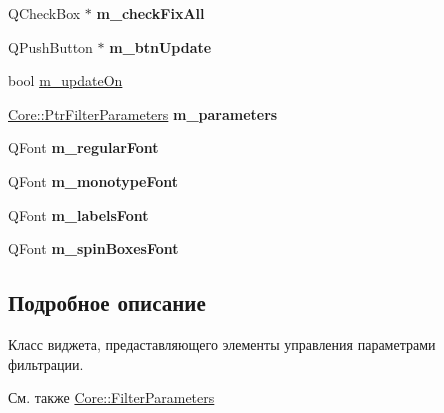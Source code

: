 \begin{DoxyCompactItemize}
\item 
\hypertarget{class_filter_parameters_widget_a0309087dfdcd0b9266fda00298aa8497}{}\label{class_filter_parameters_widget_a0309087dfdcd0b9266fda00298aa8497} 
Q\+Check\+Box $\ast$ {\bfseries m\+\_\+check\+Fix\+All}
\item 
\hypertarget{class_filter_parameters_widget_a1df61481716842b7b816a147590573f7}{}\label{class_filter_parameters_widget_a1df61481716842b7b816a147590573f7} 
Q\+Push\+Button $\ast$ {\bfseries m\+\_\+btn\+Update}
\item 
bool \hyperlink{class_filter_parameters_widget_a972435cbd7b57d2c3de2f933e7616c1c}{m\+\_\+update\+On}
\item 
\hypertarget{class_filter_parameters_widget_a55cf14ba922106b95c07267afb79d92a}{}\label{class_filter_parameters_widget_a55cf14ba922106b95c07267afb79d92a} 
\hyperlink{namespace_core_a4811af8148ba137d644b9a61a042cf03}{Core\+::\+Ptr\+Filter\+Parameters} {\bfseries m\+\_\+parameters}
\item 
\hypertarget{class_filter_parameters_widget_a9275e817244203bb801a4fdd7be409cf}{}\label{class_filter_parameters_widget_a9275e817244203bb801a4fdd7be409cf} 
Q\+Font {\bfseries m\+\_\+regular\+Font}
\item 
\hypertarget{class_filter_parameters_widget_a5b2a163e0343bc8005a1574bbe2904ad}{}\label{class_filter_parameters_widget_a5b2a163e0343bc8005a1574bbe2904ad} 
Q\+Font {\bfseries m\+\_\+monotype\+Font}
\item 
\hypertarget{class_filter_parameters_widget_a64b06f79e5dea28727141deacd44e9fb}{}\label{class_filter_parameters_widget_a64b06f79e5dea28727141deacd44e9fb} 
Q\+Font {\bfseries m\+\_\+labels\+Font}
\item 
\hypertarget{class_filter_parameters_widget_a008425a55ae4ad995ae6560e37479fee}{}\label{class_filter_parameters_widget_a008425a55ae4ad995ae6560e37479fee} 
Q\+Font {\bfseries m\+\_\+spin\+Boxes\+Font}
\end{DoxyCompactItemize}


\subsection{Подробное описание}
Класс виджета, предаставляющего элементы управления параметрами фильтрации. 

\begin{DoxySeeAlso}{См. также}
\hyperlink{class_core_1_1_filter_parameters}{Core\+::\+Filter\+Parameters} 
\end{DoxySeeAlso}



